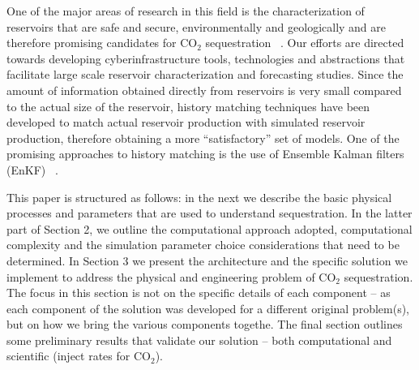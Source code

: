 \documentclass{rspublic}
\newcommand{\jhanote}[1]{ {\textcolor{red} { ***Jha: #1 }}}
\newcommand{\jhanote}[1]{}
\begin{document}
One of the major areas of research in this field is the
characterization of reservoirs that are safe and secure,
environmentally and geologically and are therefore promising
candidates for CO$_2$ sequestration ~\citep{GeoRPT,Luigi}. Our efforts
are directed towards developing cyberinfrastructure tools,
technologies and abstractions that facilitate large scale reservoir
characterization and forecasting studies.  Since the amount of
information obtained directly from reservoirs is very small compared
to the actual size of the reservoir, history matching techniques have
been developed to match actual reservoir production with simulated
reservoir production, therefore obtaining a more ``satisfactory'' set
of models. One of the promising approaches to history matching is the
use of Ensemble Kalman filters (EnKF) ~\citep{KalmanPaper, DO2007,
  LiEnKF07, DO2006}. 

This paper is structured as follows: in the next we describe the basic
physical processes and parameters that are used to understand
sequestration. In the latter part of Section 2, we outline the
computational approach adopted, computational complexity and the
simulation parameter choice considerations that need to be determined.
In Section 3 we present the architecture and the specific solution we
implement to address the physical and engineering problem of CO$_2$
sequestration. The focus in this section is not on the specific
details of each component -- as each component of the solution was
developed for a different original problem(s), but on how we bring the
various components togethe.  The final section outlines some
preliminary results that validate our solution -- both computational
and scientific (inject rates for CO$_2$).


\end{document}
